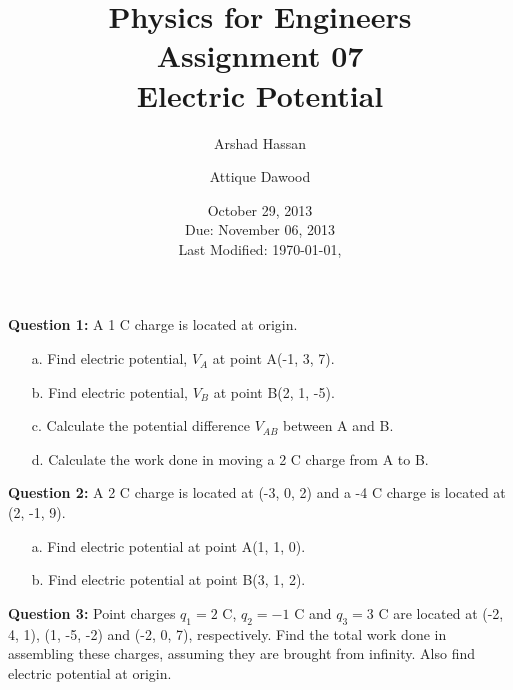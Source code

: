 \documentclass[12pt,a4paper]{article}
\title{\vspace{-3cm}Physics for Engineers\\Assignment 07\\Electric Potential}
\author{Arshad Hassan\and Attique Dawood}
\date{October 29, 2013\\Due: November 06, 2013\\[0.2cm] Last Modified: \today, \currenttime}
\begin{document}
\maketitle
\noindent\textbf{Question 1:} A 1 C charge is located at origin.
\begin{itemize}
\item[a.] Find electric potential, $V_A$ at point A(-1, 3, 7).
\item[b.] Find electric potential, $V_B$ at point B(2, 1, -5).
\item[c.] Calculate the potential difference $V_{AB}$ between A and B.
\item[d.] Calculate the work done in moving a 2 C charge from A to B.
\end{itemize}
\noindent\textbf{Question 2:} A 2 C charge is located at (-3, 0, 2) and a -4 C charge is located at (2, -1, 9).
\begin{itemize}
\item[a.] Find electric potential at point A(1, 1, 0).
\item[b.] Find electric potential at point B(3, 1, 2).
\end{itemize}
\noindent\textbf{Question 3:} Point charges $q_1=2$ C, $q_2=-1$ C and $q_3=3$ C are located at (-2, 4, 1), (1, -5, -2) and (-2, 0, 7), respectively. Find the total work done in assembling these charges, assuming they are brought from infinity. Also find electric potential at origin.
%
%
\end{document}
